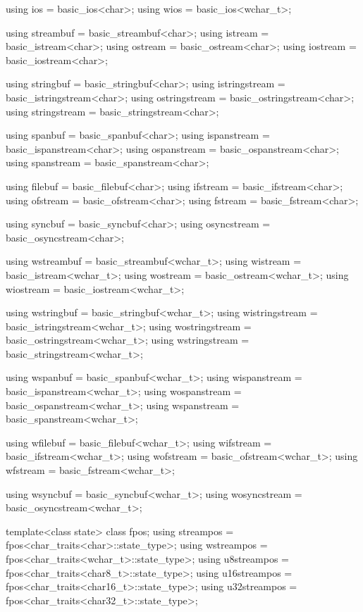 \begin{codeblock}
{  using ios  = basic_ios<char>;
  using wios = basic_ios<wchar_t>;

  using streambuf = basic_streambuf<char>;
  using istream   = basic_istream<char>;
  using ostream   = basic_ostream<char>;
  using iostream  = basic_iostream<char>;

  using stringbuf     = basic_stringbuf<char>;
  using istringstream = basic_istringstream<char>;
  using ostringstream = basic_ostringstream<char>;
  using stringstream  = basic_stringstream<char>;

  using spanbuf     = basic_spanbuf<char>;
  using ispanstream = basic_ispanstream<char>;
  using ospanstream = basic_ospanstream<char>;
  using spanstream  = basic_spanstream<char>;

  using filebuf  = basic_filebuf<char>;
  using ifstream = basic_ifstream<char>;
  using ofstream = basic_ofstream<char>;
  using fstream  = basic_fstream<char>;

  using syncbuf = basic_syncbuf<char>;
  using osyncstream = basic_osyncstream<char>;

  using wstreambuf = basic_streambuf<wchar_t>;
  using wistream   = basic_istream<wchar_t>;
  using wostream   = basic_ostream<wchar_t>;
  using wiostream  = basic_iostream<wchar_t>;

  using wstringbuf     = basic_stringbuf<wchar_t>;
  using wistringstream = basic_istringstream<wchar_t>;
  using wostringstream = basic_ostringstream<wchar_t>;
  using wstringstream  = basic_stringstream<wchar_t>;

  using wspanbuf     = basic_spanbuf<wchar_t>;
  using wispanstream = basic_ispanstream<wchar_t>;
  using wospanstream = basic_ospanstream<wchar_t>;
  using wspanstream  = basic_spanstream<wchar_t>;

  using wfilebuf  = basic_filebuf<wchar_t>;
  using wifstream = basic_ifstream<wchar_t>;
  using wofstream = basic_ofstream<wchar_t>;
  using wfstream  = basic_fstream<wchar_t>;

  using wsyncbuf = basic_syncbuf<wchar_t>;
  using wosyncstream = basic_osyncstream<wchar_t>;

  template<class state> class fpos;
  using streampos  = fpos<char_traits<char>::state_type>;
  using wstreampos = fpos<char_traits<wchar_t>::state_type>;
  using u8streampos = fpos<char_traits<char8_t>::state_type>;
  using u16streampos = fpos<char_traits<char16_t>::state_type>;
  using u32streampos = fpos<char_traits<char32_t>::state_type>;
}
\end{codeblock}

